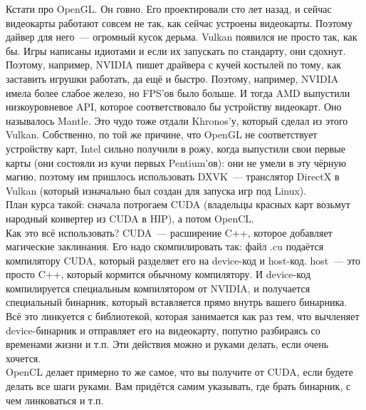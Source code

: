 \documentclass{article}
\begin{document}
    Кстати про OpenGL. Он говно. Его проектировали сто лет назад, и сейчас видеокарты работают совсем не так, как сейчас устроены видеокарты. Поэтому дайвер для него~--- огромный кусок дерьма. Vulkan появился не просто так, как бы. Игры написаны идиотами и если их запускать по стандарту, они сдохнут. Поэтому, например, NVIDIA пишет драйвера с кучей костылей по тому, как заставить игрушки работать, да ещё и быстро. Поэтому, например, NVIDIA имела более слабое железо, но FPS'ов было больше. И тогда AMD выпустили низкоуровневое API, которое соответствовало бы устройству видеокарт. Оно называлось Mantle. Это чудо тоже отдали Khronos'у, который сделал из этого Vulkan. Собственно, по той же причине, что OpenGL не соответствует устройству карт, Intel сильно получили в рожу, когда выпустили свои первые карты (они состояли из кучи первых Pentium'ов): они не умели в эту чёрную магию, поэтому им пришлось использовать DXVK~--- транслятор DirectX в Vulkan (который изначально был создан для запуска игр под Linux).\\
    План курса такой: сначала потрогаем CUDA (владельцы красных карт возьмут народный конвертер из CUDA в HIP), а потом OpenCL.\\
    Как это всё использовать? CUDA~--- расширение C++, которое добавляет магические заклинания. Его надо скомпилировать так: файл .cu подаётся компилятору CUDA, который разделяет его на device-код и host-код. host~--- это просто C++, который кормится обычному компилятору. И device-код компилируется специальным компилятором от NVIDIA, и получается специальный бинарник, который вставляется прямо внутрь вашего бинарника. Всё это линкуется с библиотекой, которая занимается как раз тем, что вычленяет device-бинарник и отправляет его на видеокарту, попутно разбираясь со временами жизни и т.п. Эти действия можно и руками делать, если очень хочется.\\
    OpenCL делает примерно то же самое, что вы получите от CUDA, если будете делать все шаги руками. Вам придётся самим указывать, где брать бинарник, с чем линковаться и т.п.
\end{document}
